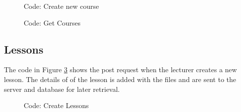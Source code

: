 \documentclass[a4paper,12pt]{article}
\numberwithin{equation}{section} %
\numberwithin{figure}{section}
\begin{document}
\begin{figure}[H]
\centering
{}
\caption{Code: Create new course}
\label{cPostcourse}
\end{figure}

\begin{figure}[H]
\centering
{}
\caption{Code: Get Courses}
\label{ccourses}
\end{figure}

\subsection{Lessons}
The code in Figure \ref{cLessons} shows the post request when the lecturer creates a new lesson. The details of of the lesson is added with the files and are sent to the server and database for later retrieval.

\begin{figure}[H]
\centering
{}
\caption{Code: Create Lessons}
\label{cLessons}
\end{figure}
\end{document}
